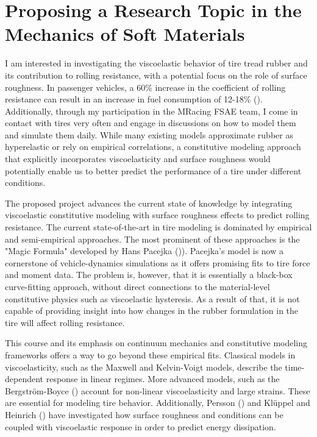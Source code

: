 \section*{Proposing a Research Topic in the Mechanics of Soft Materials}

I am interested in investigating the viscoelastic behavior of tire tread rubber and its contribution to rolling resistance, with a potential focus on the role of surface roughness. In passenger vehicles, a 60\% increase in the coefficient of rolling resistance can result in an increase in fuel consumption of 12-18\% (\cite{swieczko-zurekTyreRollingResistance2017}). Additionally, through my participation in the MRacing FSAE team, I come in contact with tires very often and engage in discussions on how to model them and simulate them daily. While many existing models approximate rubber as hyperelastic or rely on empirical correlations, a constitutive modeling approach that explicitly incorporates viscoelasticity and surface roughness would potentially enable us to better predict the performance of a tire under different conditions.

The proposed project advances the current state of knowledge by integrating viscoelastic constitutive modeling with surface roughness effects to predict rolling resistance. The current state-of-the-art in tire modeling is dominated by empirical and semi-empirical approaches. The most prominent of these approaches is the "Magic Formula" developed by Hans Pacejka (\cite{pacejkaMagicFormula1992})). Pacejka's model is now a cornerstone of vehicle-dynamics simulations as it offers promising fits to tire force and moment data. The problem is, however, that it is essentially a black-box curve-fitting approach, without direct connections to the material-level constitutive physics such as viscoelastic hysteresis. As a result of that, it is not capable of providing insight into how changes in the rubber formulation in the tire will affect rolling resistance.

This course and its emphasis on continuum mechanics and constitutive modeling frameworks offers a way to go beyond these empirical fits. Classical models in viscoelasticity, such as the Maxwell and Kelvin-Voigt models, describe the time-dependent response in linear regimes. More advanced models, such as the Bergström-Boyce (\cite{bergstrom-boyceConstModelLargeStrain1998}) account for non-linear viscoelasticity and large strains. These are essential for modeling tire behavior. Additionally, Persson (\cite{perssonRubberFrictionContactMech2001}) and Klüppel and Heinrich (\cite{kluppel-heinrichRubberFrictionSelfAffineRoad2000}) have investigated how surface roughness and conditions can be coupled with viscoelastic response in order to predict energy dissipation.

